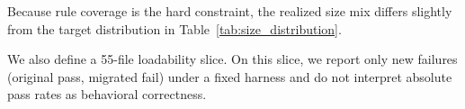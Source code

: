 Because rule coverage is the hard constraint, the realized size mix differs slightly from the target distribution in Table~\ref{tab:size_distribution}.

We also define a 55-file loadability slice. On this slice, we report only new failures (original pass, migrated fail) under a fixed harness and do not interpret absolute pass rates as behavioral correctness.